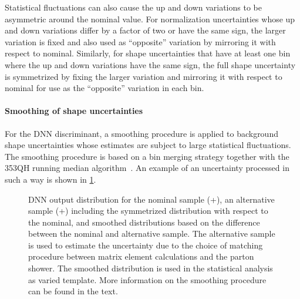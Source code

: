 Statistical fluctuations can also cause the up and down variations to be asymmetric around the nominal value. 
For normalization uncertainties whose up and down variations differ by a factor of two or have the same sign, the larger variation is fixed and also used as ``opposite'' variation by mirroring it with respect to nominal.
Similarly, for shape uncertainties that have at least one bin where the up and down variations have the same sign, the full shape uncertainty is symmetrized by fixing the larger variation and mirroring it with respect to nominal for use as the ``opposite'' variation in each bin.

\paragraph{Smoothing of shape uncertainties}
For the DNN discriminant, a smoothing procedure is applied to background shape uncertainties whose estimates are subject to large statistical fluctuations. 
The smoothing procedure is based on a bin merging strategy together with the 353QH running median algorithm~\cite{Friedman353QH}. 
An example of an uncertainty processed in such a way is shown in \cref{fig:dnn:smoothing}.
\begin{figure}[th]
    \centering
    {\caption{DNN output distribution for the nominal \ttbar sample (\Powheg+\PYTHIAV), an alternative sample (\aMCATNLO+\PYTHIAV) including the symmetrized distribution with respect to the nominal, and smoothed distributions based on the difference between the nominal and alternative sample. The alternative sample is used to estimate the uncertainty due to the choice of matching procedure between matrix element calculations and the parton shower. The smoothed distribution is used in the statistical analysis as varied template. More information on the smoothing procedure can be found in the text.
    \label{fig:dnn:smoothing} }}
\end{figure}

